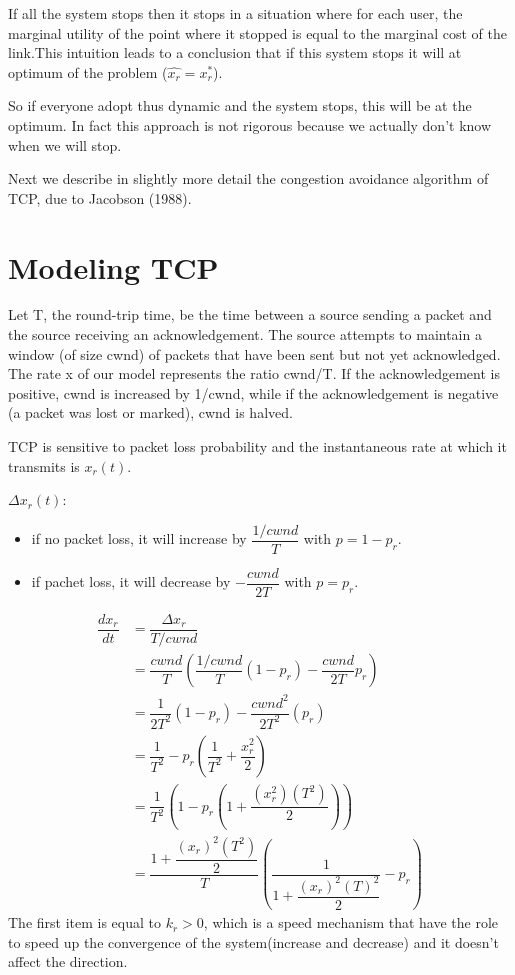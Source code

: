 If all the system stops then it stops in a situation where for each user, the marginal utility of the point where it stopped is equal to the marginal cost of the link.This intuition leads to a conclusion that if this system stops it will  at optimum of the problem ($\widehat{x_r}=x^*_r$).

So if everyone adopt thus dynamic and the system stops, this will be at the optimum. In fact this approach is not rigorous because we actually don't know when we will stop.

Next we describe in slightly more detail the congestion avoidance algorithm of TCP, due to Jacobson (1988).

\section{Modeling TCP}

\begin{definition}
Let T, the round-trip time, be the time between a source sending a packet and the source receiving an acknowledgement. The source attempts to maintain a window (of size cwnd) of packets that have been sent but not yet acknowledged. The rate x of our model represents the ratio cwnd/T. If the acknowledgement is positive, cwnd is increased by 1/cwnd, while if the acknowledgement is negative (a packet was lost or marked), cwnd is halved.
\end{definition}
TCP is sensitive to packet loss probability and the instantaneous rate at which it transmits is $x_r(t).$

$\Delta x_r(t)$:
\begin{itemize}
	\item if no packet loss, it will increase by $ \dfrac{1/cwnd}{T}$ with $p=1-p_r$.
	\item if pachet loss, it will decrease by $-\dfrac{cwnd}{2T}$ with $p=p_r$.
\end{itemize}

\begin{equation}
\label{eq:der}
\begin{split}
\dfrac{dx_r}{dt}&=\dfrac{\Delta x_r}{T/cwnd} \\
&=\dfrac{cwnd}{T}(\dfrac{1/cwnd}{T}(1-p_r)- \dfrac{cwnd}{2T} p_r )\\
&=\dfrac{1}{2T^2}(1-p_r)-\dfrac{cwnd^2}{2T^2}(p_r)\\
&=\dfrac{1}{T^2}-p_r(\dfrac{1}{T^2}+\dfrac{x_r^2}{2})\\
&=\dfrac{1}{T^2}(1-p_r(1+\dfrac{(x_r^2) (T^2)}{2}))\\
&=\dfrac{1+\dfrac{(x_r)^2(T^2)}{2}}{T}(\dfrac{1}{1+\dfrac{(x_r)^2(T)^2}{2}}-p_r)
\end{split}
\end{equation}
The first item is equal to $k_r >0$, which is a speed mechanism that have the role to speed up the convergence of the system(increase and decrease) and it doesn't affect the direction.

